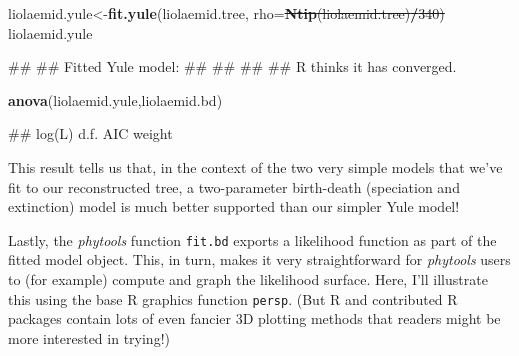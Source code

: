 \documentclass[fleqn,10pt,lineno]{wlpeerj}
\newenvironment{Shaded}{\begin{snugshade}}{\end{snugshade}}
\newcommand{\AttributeTok}[1]{\textcolor[rgb]{0.13,0.29,0.53}{#1}}
\newcommand{\DecValTok}[1]{\textcolor[rgb]{0.00,0.00,0.81}{#1}}
\newcommand{\FunctionTok}[1]{\textcolor[rgb]{0.13,0.29,0.53}{\textbf{#1}}}
\newcommand{\NormalTok}[1]{#1}
\newcommand{\OtherTok}[1]{\textcolor[rgb]{0.56,0.35,0.01}{#1}}
\newcommand{\SpecialCharTok}[1]{\textcolor[rgb]{0.81,0.36,0.00}{\textbf{#1}}}
\providecommand{\DIFaddtex}[1]{{\protect\color{blue}\uwave{#1}}} %
\providecommand{\DIFdeltex}[1]{{\protect\color{red}\sout{#1}}}                      %
\providecommand{\DIFaddbegin}{} %
\providecommand{\DIFaddend}{} %
\providecommand{\DIFdelbegin}{} %
\providecommand{\DIFdelend}{} %
\providecommand{\DIFmodbegin}{} %
\providecommand{\DIFmodend}{} %
\providecommand{\DIFadd}[1]{\texorpdfstring{\DIFaddtex{#1}}{#1}} %
\providecommand{\DIFdel}[1]{\texorpdfstring{\DIFdeltex{#1}}{}} %
\newcommand{\DIFscaledelfig}{0.5}
\newlength{\DIFdelgraphicswidth} %
\newlength{\DIFdelgraphicsheight} %
\newcommand{\DIFaddincludegraphics}[2][]{{\color{blue}\fbox{\DIFOincludegraphics[#1]{#2}}}} %
\newcommand{\DIFdelincludegraphics}[2][]{%
\sbox{\DIFdelgraphicsbox}{\DIFOincludegraphics[#1]{#2}}%
\settoboxwidth{\DIFdelgraphicswidth}{\DIFdelgraphicsbox} %
\settoboxtotalheight{\DIFdelgraphicsheight}{\DIFdelgraphicsbox} %
\scalebox{\DIFscaledelfig}{%
\parbox[b]{\DIFdelgraphicswidth}{\usebox{\DIFdelgraphicsbox}\\[-\baselineskip] \rule{\DIFdelgraphicswidth}{0em}}\llap{\resizebox{\DIFdelgraphicswidth}{\DIFdelgraphicsheight}{%
\setlength{\unitlength}{\DIFdelgraphicswidth}%
\begin{picture}(1,1)%
\thicklines\linethickness{2pt} %
{\color[rgb]{1,0,0}\put(0,0){\framebox(1,1){}}}%
{\color[rgb]{1,0,0}\put(0,0){\line( 1,1){1}}}%
{\color[rgb]{1,0,0}\put(0,1){\line(1,-1){1}}}%
\end{picture}%
}\hspace*{3pt}}} %
} %
\DeclareRobustCommand{\DIFaddbegin}{\DIFOaddbegin \let\includegraphics\DIFaddincludegraphics} %
\DeclareRobustCommand{\DIFaddend}{\DIFOaddend \let\includegraphics\DIFOincludegraphics} %
\DeclareRobustCommand{\DIFdelbegin}{\DIFOdelbegin \let\includegraphics\DIFdelincludegraphics} %
\DeclareRobustCommand{\DIFdelend}{\DIFOaddend \let\includegraphics\DIFOincludegraphics} %
\begin{document}
\begin{Shaded}
\begin{Highlighting}[]
\NormalTok{liolaemid.yule}\OtherTok{\textless{}{-}}\FunctionTok{fit.yule}\NormalTok{(liolaemid.tree,}
  \AttributeTok{rho=}\DIFdelbegin \DIFdel{\FunctionTok{Ntip}\NormalTok{(liolaemid.tree)}\SpecialCharTok{/}\DecValTok{340}\NormalTok{)}
}\DIFdelend \DIFaddbegin \DIFadd{\NormalTok{liolaemid.rho)}
}\DIFaddend \NormalTok{liolaemid.yule}
\end{Highlighting}
\end{Shaded}

\DIFmodbegin
\begin{DIFverbatim}[alsolanguage=DIFcode]
## 
## Fitted Yule model:
## 
## 
## 
## R thinks it has converged.
\end{DIFverbatim}
\DIFmodend

\begin{Shaded}
\begin{Highlighting}[]
\FunctionTok{anova}\NormalTok{(liolaemid.yule,liolaemid.bd)}
\end{Highlighting}
\end{Shaded}

\DIFmodbegin
\begin{DIFverbatim}[alsolanguage=DIFcode]
##                  log(L) d.f.       AIC     weight
\end{DIFverbatim}
\DIFmodend

This result tells us that, in the context of the two very simple models
that we've fit to our reconstructed tree, a two-parameter birth-death
(speciation and extinction) model is much better supported than our
simpler Yule model!

Lastly, the \emph{phytools} function \texttt{fit.bd} exports a
likelihood function as part of the fitted model object. This, in turn,
makes it very straightforward for \emph{phytools} users to (for example)
compute and graph the likelihood surface. Here, I'll illustrate this
using the base R graphics function \texttt{persp}. (But R and
contributed R packages contain lots of even fancier 3D plotting methods
that readers might be more interested in trying!)
\end{document}
